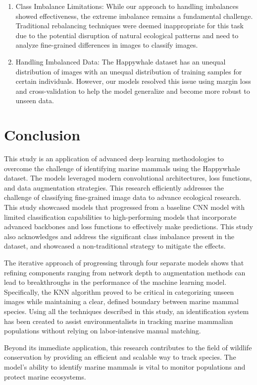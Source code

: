 \documentclass[twocolumn]{article}
\begin{document}
\begin{enumerate}
    \item Class Imbalance Limitations: While our approach to handling imbalances showed effectiveness, the extreme imbalance remains a fundamental challenge. Traditional rebalancing techniques were deemed inappropriate for this task due to the potential disruption of natural ecological patterns and need to analyze fine-grained differences in images to classify images. 
    \item Handling Imbalanced Data: The Happywhale dataset has an unequal distribution of images with an unequal distribution of training samples for certain individuals. However, our models resolved this issue using margin loss and cross-validation to help the model generalize and become more robust to unseen data.
\end{enumerate}

\section{Conclusion}

This study is an application of advanced deep learning methodologies to overcome the challenge of identifying marine mammals using the Happywhale dataset. The models leveraged modern convolutional architectures, loss functions, and data augmentation strategies. This research efficiently addresses the challenge of classifying fine-grained image data to advance ecological research. This study showcased models that progressed from a baseline CNN model with limited classification capabilities to high-performing models that incorporate advanced backbones and loss functions to effectively make predictions. This study also acknowledges and address the significant class imbalance present in the dataset, and showcased a non-traditional strategy to mitigate the effects.  

The iterative approach of progressing through four separate models shows that refining components ranging from network depth to augmentation methods can lead to breakthroughs in the performance of the machine learning model. Specifically, the KNN algorithm proved to be critical in categorizing unseen images while maintaining a clear, defined boundary between marine mammal species. Using all the techniques described in this study, an identification system has been created to assist environmentalists in tracking marine mammalian populations without relying on labor-intensive manual matching.

Beyond its immediate application, this research contributes to the field of wildlife conservation by providing an efficient and scalable way to track species. The model's ability to identify marine mammals is vital to monitor populations and protect marine ecosystems.
\end{document}
